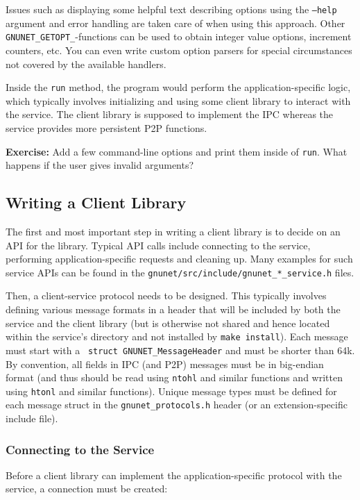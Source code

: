 \documentclass[10pt]{article}
\newcommand{\exercise}[1]{\noindent\begin{boxedminipage}{\textwidth}{\bf Exercise:} #1 \end{boxedminipage}}
\begin{document}
Issues such as displaying some helpful text describing options using
the {\tt --help} argument and error handling are taken care of when
using this approach.  Other {\tt GNUNET\_GETOPT\_}-functions can be used
to obtain integer value options, increment counters, etc.  You can
even write custom option parsers for special circumstances not covered
by the available handlers.

Inside the {\tt run} method, the program would perform the
application-specific logic, which typically involves initializing and
using some client library to interact with the service.  The client
library is supposed to implement the IPC whereas the service provides
more persistent P2P functions.

\exercise{Add a few command-line options and print them inside
of {\tt run}.  What happens if the user gives invalid arguments?}

\subsection{Writing a Client Library}

The first and most important step in writing a client library is to
decide on an API for the library.  Typical API calls include 
connecting to the service, performing application-specific requests
and cleaning up.  Many examples for such service APIs can be found
in the {\tt gnunet/src/include/gnunet\_*\_service.h} files.

Then, a client-service protocol needs to be designed.  This typically
involves defining various message formats in a header that will be
included by both the service and the client library (but is otherwise
not shared and hence located within the service's directory and not
installed by {\tt make install}).  Each message must start with a {\tt
  struct GNUNET\_MessageHeader} and must be shorter than 64k.  By
convention, all fields in IPC (and P2P) messages must be in big-endian
format (and thus should be read using {\tt ntohl} and similar
functions and written using {\tt htonl} and similar functions).
Unique message types must be defined for each message struct in the
{\tt gnunet\_protocols.h} header (or an extension-specific include
file).

\subsubsection{Connecting to the Service}

Before a client library can implement the application-specific protocol
with the service, a connection must be created:
\end{document}
